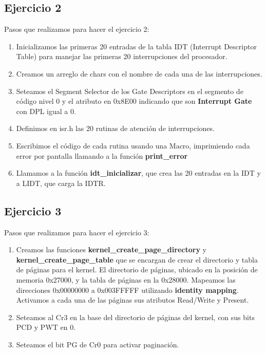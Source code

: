 \documentclass[a4paper,10pt]{article}
\begin{document}
\subsection{Ejercicio 2}
Pasos que realizamos para hacer el ejercicio 2:
\begin{enumerate}
  \item Inicializamos las primeras 20 entradas de la tabla IDT (Interrupt Descriptor Table) para manejar las primeras 20 interrupciones del procesador.
  \item Creamos un arreglo de chars con el nombre de cada una de las interrupciones.
  \item Seteamos el Segment Selector de los Gate Descriptors en el segmento de código nivel 0 y el atributo en 0x8E00 indicando que son \textbf{Interrupt Gate} con DPL igual a 0.
  \item Definimos en isr.h las 20 rutinas de atención de interrupciones.
  \item Escribimos el código de cada rutina usando una Macro, imprimiendo cada error por pantalla llamando a la función \textbf{print\_error} 
  \item Llamamos a la función \textbf{idt\_inicializar}, que crea las 20 entradas en la IDT y a LIDT, que carga la IDTR.
\end{enumerate}

\subsection{Ejercicio 3}
Pasos que realizamos para hacer el ejercicio 3:
\begin{enumerate}
  \item Creamos las funciones \textbf{kernel\_create\_page\_directory} y \textbf{kernel\_create\_page\_table} que se encargan de crear el directorio y tabla de páginas para el kernel.
    El directorio de páginas, ubicado en la posición de memoria 0x27000, y la tabla de páginas en la 0x28000.
    Mapeamos las direcciones 0x00000000 a 0x003FFFFF utilizando \textbf{identity mapping}. Activamos a cada una de las páginas sus atributos Read/Write y Present.
  \item Seteamos al Cr3 en la base del directorio de páginas del kernel, con sus bits PCD y PWT en 0.
  \item Seteamos el bit PG de Cr0 para activar paginación.
\end{enumerate} 
\end{document}
